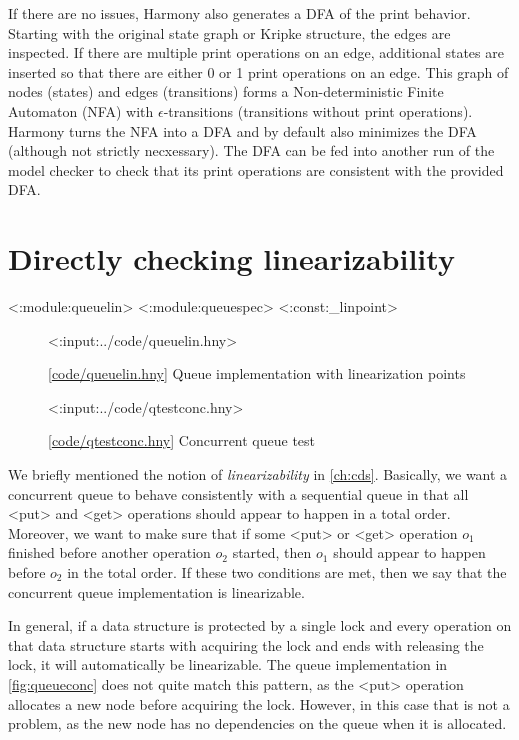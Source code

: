 \documentclass{report}
\newcommand{\harmonylink}[1]{%
[\href{https://harmony.cs.cornell.edu/#1}{\underline{#1}}]%
}
\newenvironment{code}{
\tcolorbox
}{
\endtcolorbox
}
\begin{document}
If there are no issues, Harmony also generates a DFA of the print
behavior.  Starting with the original state graph or Kripke structure,
the edges are inspected.  If there are multiple print operations on
an edge, additional states are inserted so that there are either 0
or 1 print operations on an edge.  This graph of nodes (states) and edges
(transitions)
forms a Non-deterministic Finite Automaton (NFA) with $\epsilon$-transitions
(transitions without print operations).  Harmony turns the NFA into a DFA
and by default also minimizes the DFA (although not strictly
necxessary).  The DFA can be fed into another run of the model checker
to check that its print operations are consistent with the provided DFA.

\chapter{Directly checking linearizability}

<{:module:queuelin}>
<{:module:queuespec}>
<{:const:_linpoint}>

\begin{figure}
\begin{code}
<{:input:../code/queuelin.hny}>
\end{code}
\caption{\harmonylink{code/queuelin.hny} Queue implementation with linearization points}
\label{fig:queuelin}
\end{figure}

\begin{figure}
\begin{code}
<{:input:../code/qtestconc.hny}>
\end{code}
\caption{\harmonylink{code/qtestconc.hny} Concurrent queue test}
\label{fig:qtestconc}
\end{figure}

We briefly mentioned the notion of \emph{linearizability}
in \autoref{ch:cds}.
Basically, we want a concurrent queue to behave
consistently with a sequential queue in that all
<{put}>
and <{get}> operations should appear to happen
in a total order.
Moreover, we want to make sure that if some
<{put}> or <{get}> operation $o_1$ finished
before another operation $o_2$ started, then $o_1$
should appear to happen before $o_2$ in the total order.
If these two conditions are met, then we say that
the concurrent queue implementation is linearizable.

In general, if a data structure is protected by
a single lock and every operation on that data
structure starts with acquiring the lock and ends
with releasing the lock, it will automatically be
linearizable.
The queue implementation in \autoref{fig:queueconc} does
not quite match this pattern, as the <{put}>
operation allocates a new node before acquiring
the lock.
However, in this case that is not a problem, as
the new node has no dependencies on the queue
when it is allocated.
\end{document}
